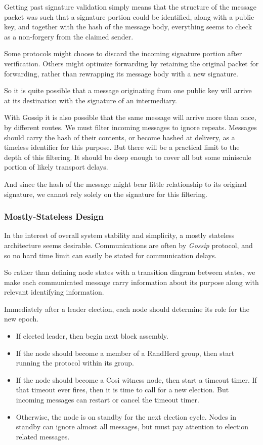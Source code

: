 \documentclass{yellowpaper}
\begin{document}
Getting past signature validation simply means that the structure of the message packet was such that a signature portion could be identified, along with a public key, and together with the hash of the message body, everything seems to check as a non-forgery from the claimed sender.

Some protocols might choose to discard the incoming signature portion after verification. Others might optimize forwarding by retaining the original packet for forwarding, rather than rewrapping its message body with a new signature. 

So it is quite possible that a message originating from one public key will arrive at its destination with the signature of an intermediary.

With Gossip it is also possible that the same message will arrive more than once, by different routes. We must filter incoming messages to ignore repeats. Messages should carry the hash of their contents, or become hashed at delivery, as a timeless identifier for this purpose. But there will be a practical limit to the depth of this filtering. It should be deep enough to cover all but some miniscule portion of likely transport delays.

And since the hash of the message might bear little relationship to its original signature, we cannot rely solely on the signature for this filtering.

\subsubsection{Mostly-Stateless Design}
In the interest of overall system stability and simplicity, a mostly stateless architecture seems desirable. Communications are often by {\em{Gossip}} protocol, and so no hard time limit can easily be stated for communication delays.

So rather than defining node states with a transition diagram between states, we make each communicated message  carry information about its purpose along with relevant identifying information.  

Immediately after a leader election, each node should determine its role for the new epoch. 
\begin{itemize}
    \item If elected leader, then begin next block assembly. 
    \item If the node should become a member of a RandHerd group, then start running the protocol within its group.
    \item If the node should become a Cosi witness node, then start a timeout timer. If that timeout ever fires, then it is time to call for a new election. But incoming messages can restart or cancel the timeout timer.
    \item Otherwise, the node is on standby for the next election cycle. Nodes in standby can ignore almost all messages, but must pay attention to election related messages.
\end{itemize}  
\end{document}
